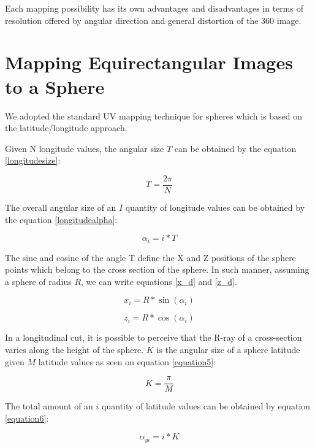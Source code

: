 \documentclass[12pt]{article}
\begin{document}
Each mapping possibility has its own advantages and disadvantages in terms of resolution offered by angular direction and general distortion of the 360 image.

\section{Mapping Equirectangular Images to a Sphere}
We adopted the standard UV mapping technique for spheres which is based on the latitude/longitude approach.  

Given N longitude values, the angular size $T$ can be obtained by the equation \ref{longitudesize}:

\begin{equation}
T = \frac{2 \pi}{N}
\label{longitudesize}
\end{equation}

The overall angular size of an $I$ quantity of longitude values can be obtained by the equation \ref{longitudealpha}:

\begin{equation}
\alpha_{i} = i * T
\label{longitudealpha}
\end{equation}

The sine and cosine of the angle T define the X and Z positions of the sphere points which belong to the cross section of the sphere. In such manner, assuming a sphere of radius $R$, we can write equations \ref{x_d} and \ref{z_d}. 

\begin{equation}
x_{i} = R * \sin(\alpha_{i})
\label{x_d}
\end{equation}

\begin{equation}
z_{i} = R * \cos(\alpha_{i})
\label{z_d}
\end{equation}

In a longitudinal cut, it is possible to perceive that the R-ray of a cross-section varies along the height of the sphere. $K$ is the angular size of a sphere latitude given $M$ latitude values as seen on equation \ref{equation5}:

\begin{equation}
K = \frac{\pi}{M}
\label{equation5}
\end{equation}

The total amount of an $i$ quantity of latitude values can be obtained by equation \ref{equation6}:

\begin{equation}
\alpha_{yi} = i * K
\label{equation6}
\end{equation}
\end{document}
